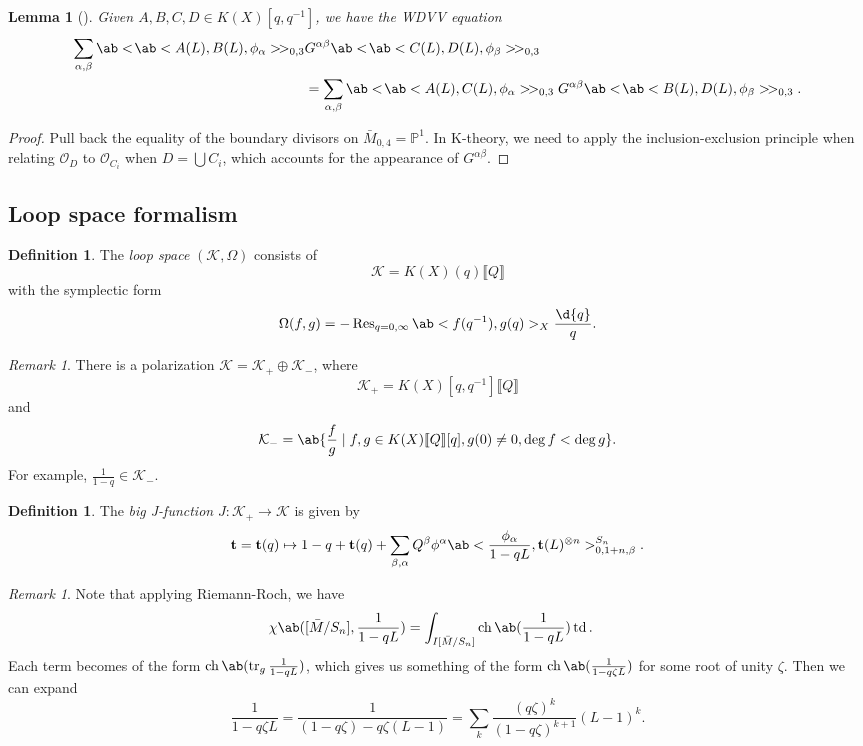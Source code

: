 \documentclass{amsart}
\newtheorem{lem}[thm]{Lemma}
\theoremstyle{definition}
\newtheorem{defn}[thm]{Definition}
\theoremstyle{remark}
\newtheorem{rmk}[thm]{Remark}
\theoremstyle{plain}
\theoremstyle{definition}
\theoremstyle{remark}
\renewcommand{\P}{\mathbb{P}}
\newcommand{\mc}[1]{\mathcal{#1}}
\newcommand{\on}[1]{\operatorname{#1}}
\newcommand{\1}{\mathbf{1}}
\newcommand{\2}{\mathbf{2}}
\newcommand{\3}{\mathbf{3}}
\newcommand{\ps}[1]{\llbracket #1 \rrbracket}
\begin{document}
\begin{lem}[{\cite{Givental2000K}}]
    Given \(A,B,C,D \in K(X)[q,q^{-1}]\), we have the \textit{WDVV equation}
    \begin{align*}
        \sum_{\alpha,\beta} \ab<\!\ab< A(L), B(L), \phi_{\alpha}>\! >_{0,3}& G^{\alpha\beta}\ab<\!\ab< C(L), D(L), \phi_{\beta}>\! >_{0,3} \\
        &= \sum_{\alpha,\beta} \ab<\!\ab< A(L), C(L), \phi_{\alpha}>\! >_{0,3} G^{\alpha\beta}\ab<\!\ab< B(L), D(L), \phi_{\beta}>\! >_{0,3}. 
    \end{align*}
\end{lem}

\begin{proof}
    Pull back the equality of the boundary divisors on \(\bar{M}_{0,4} = \P^1\). In K-theory, we need to apply the inclusion-exclusion principle when relating \(\mc{O}_D\) to \(\mc{O}_{C_i}\) when \(D = \bigcup C_i\), which accounts for the appearance of \(G^{\alpha\beta}\).
\end{proof}

\subsection{Loop space formalism}%
\label{sub:Loop space formalism}

\begin{defn}
    The \textit{loop space} \((\mc{K}, \Omega)\) consists of 
    \[ \mc{K} = K(X)(q) \ps{Q}\]
    with the symplectic form
    \[ \Omega(f, g) = - \on{Res}_{q = 0, \infty} \ab<f(q^{-1}), g(q)>_X \frac{\d{q}}{q}. \]
\end{defn}

\begin{rmk}
    There is a polarization \(\mc{K} = \mc{K}_+ \oplus \mc{K}_-\), where
    \[ \mc{K}_+ = K(X)[q, q^{-1}]\ps{Q} \]
    and
    \[ \mc{K}_- = \ab\{ \frac{f}{g} \mid f, g \in K(X)\ps{Q}[q], g(0) \neq 0, \deg f < \deg g\}. \]
    For example, \(\frac{1}{1-q} \in \mc{K}_-\).
\end{rmk}

\begin{defn}
    The \textit{big J-function} \(J \colon \mc{K}_+ \to \mc{K}\) is given by
    \[ \mathbf{t} = \mathbf{t}(q) \mapsto 1 - q + \mathbf{t}(q) + \sum_{\beta, \alpha} Q^{\beta} \phi^{\alpha} \ab< \frac{\phi_{\alpha}}{1-qL}, \mathbf{t}(L)^{\otimes n}>_{0, 1+n, \beta}^{S_n}. \]
\end{defn}

\begin{rmk}
    Note that applying Riemann-Roch, we have
    \begin{align*}
        \chi\ab([\bar{M}/S_n], \frac{1}{1-qL}) &= \int_{I[\bar{M}/S_n]} \on{ch}\ab(\frac{1}{1-qL}) \on{td}.
    \end{align*}
    Each term becomes of the form \(\on{ch}\ab(\on{tr}_g \frac{1}{1-qL})\), which gives us something of the form \(\on{ch}\ab(\frac{1}{1-q\zeta L})\) for some root of unity \(\zeta\). Then we can expand
    \[ \frac{1}{1-q\zeta L} = \frac{1}{(1-q \zeta) - q\zeta (L-1)} = \sum_k \frac{(q\zeta)^k}{(1-q\zeta)^{k+1}}(L-1)^k. \]
\end{rmk}
\end{document}

